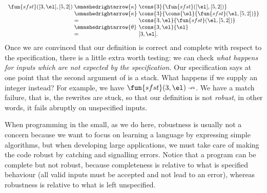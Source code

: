\begin{equation*}
\begin{array}{r@{\;}l@{\;}l}
\fun{sfst}([3,\el],[5,2])
& \smashedrightarrow{\kappa} & \cons{3}{\fun{sfst}([\el],[5,2])}\\
& \smashedrightarrow{\kappa} & \cons{3}{\cons{\el}{\fun{sfst}(\el,[5,2])}}\\
& = & \cons{3,\el}{\fun{sfst}(\el,[5,2])}\\
& \smashedrightarrow{\theta} & \cons{3,\el}{\el}\\
& = & [3,\el].
\end{array}
\end{equation*}
Once we are convinced that our definition is correct
and complete with respect to the specification, there is a little
extra worth testing: we can check \emph{what happens for inputs which
  are not expected by the specification.} Our specification says at
one point that the second argument of  is a stack. What
happens if we supply an integer instead? For example, we have
\(\fun{sfst}(3,\el) \nrightarrow\). We have a match failure, that is,
the rewrites are stuck, so that our definition is not
\emph{robust}, in other words, it fails abruptly on
unspecified inputs.

When programming in the small, as we do here, robustness is usually
not a concern because we want to focus on learning a language by
expressing simple algorithms, but when developing large applications,
we must take care of making the code robust by catching and signalling
errors. Notice that a program can be complete but
not robust, because completeness is relative to
what is specified behaviour (all valid inputs must be accepted and not
lead to an error), whereas robustness is relative to what is left
unspecified.

